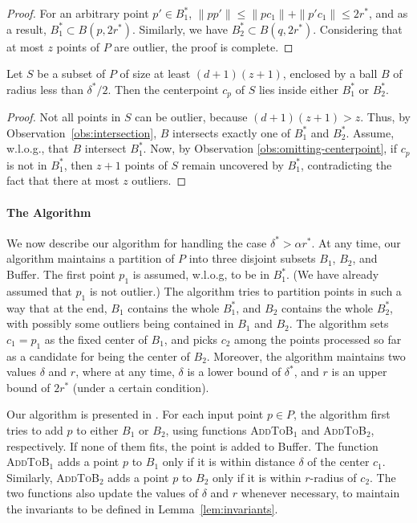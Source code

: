 \documentclass[envcountsame]{cls/cccg15}
\newcommand{\rc}{r}
\newcommand{\dz}{(d + 1)(z + 1)}
\newcommand{\textproc}{\textsc}
\newcommand{\len}[1]{\|{#1}\|}
\newcommand{\lee}{\leqslant}
\renewcommand{\leq}{\lee}
\begin{document}
\begin{proof}
	For an arbitrary point $p' \in B_1^*$, $\len{pp'} \leq \len{pc_1} + \len{p'c_1} \leq 2r^*$,
	and as a result, $B_1^* \subset B(p, 2r^*)$.
	Similarly, we have $B_2^* \subset B(q, 2r^*)$. 
	Considering that at most $z$ points of $P$ are outlier, the proof is complete.
\end{proof}

\begin{lemma}
\label{lem:center-point}
	Let $S$ be a subset of $P$ of size at least $\dz$,
	enclosed by a ball $B$ of radius less than $\delta^* / 2$.
	Then the centerpoint $c_p$ of $S$ lies inside either $B_1^{*}$ or $B_2^{*}$.
\end{lemma}

\begin{proof}
	Not all points in $S$ can be outlier, because $\dz > z$.
	Thus, by Observation~\ref{obs:intersection},
	$B$ intersects exactly one of $B_1^*$ and $B_2^*$.
	Assume, w.l.o.g., that $B$ intersect $B_1^*$. 
	Now, by Observation \ref{obs:omitting-centerpoint}, 
	if $c_p$ is not in $B_1^*$, 
	then $z+1$ points of $S$ remain uncovered by $B_1^*$,
	contradicting the fact that there at most $z$ outliers.	
\end{proof}

\paragraph{The Algorithm}
We now describe our algorithm for handling the case  $\delta^* > \alpha r^*$.
At any time, our algorithm maintains a partition of $P$ into three disjoint subsets
$B_1$, $B_2$, and Buffer.
The first point $p_1$ is assumed, w.l.o.g, to be in $B_1^*$. 
(We have already assumed that $p_1$ is not outlier.)
The algorithm tries to partition points in such a way that 
at the end,
$B_1$ contains the whole $B_1^*$, and $B_2$ contains the whole $B_2^*$,
with possibly some outliers being contained in $B_1$ and $B_2$.
The algorithm sets $c_1 = p_1$ as the fixed center of $B_1$,
and picks $c_2$ among the points processed so far as a candidate 
for being the center of $B_2$.
Moreover, the algorithm maintains two values $\delta$ and $r$,
where at any time, $\delta$ is a lower bound of $\delta^*$, 
and $r$ is an upper bound of $2r^*$ (under a certain condition). %

Our algorithm is presented in .
For each input point $p \in P$, the algorithm first tries 
to add $p$ to either $B_1$ or $B_2$,
using functions \textproc{AddToB$_1$} and \textproc{AddToB$_2$}, respectively.
If none of them fits, the point is added to Buffer.
The function \textproc{AddToB$_1$} adds a point $p$ to $B_1$
only if it is within distance $\delta$ of the center $c_1$.
Similarly, \textproc{AddToB$_2$} adds a point $p$ to $B_2$
only if it is within $\rc$-radius of $c_2$. 
The two functions also update the values of $\delta$ and $\rc$ whenever necessary,
to maintain the invariants to be defined in Lemma~\ref{lem:invariants}.
\end{document}

